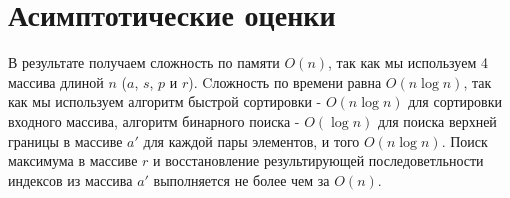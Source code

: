 \documentclass[12pt]{article}
\begin{document}
\section{Асимптотические оценки}
В результате получаем сложность по памяти $O(n)$, так как мы используем 4 массива длиной $n$ ($a$, $s$, $p$ и $r$). Cложность по времени равна $O(n\log n)$, так как мы используем алгоритм быстрой сортировки - $O(n\log n)$ для сортировки входного массива, алгоритм бинарного поиска - $O(\log n)$ для поиска верхней границы в массиве $a'$ для каждой пары элементов, и того $O(n\log n)$. Поиск максимума в массиве $r$ и восстановление результирующей последоветльности индексов из массива $a'$ выполняется не более чем за $O(n)$.
\end{document}
